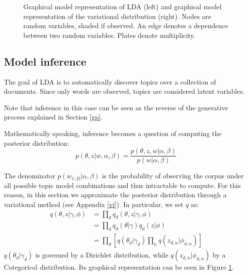 \begin{figure}[h]
    \centering
    \caption{Graphical model representation of LDA (left) and graphical model representation of the variational distribution (right). Nodes are random variables, shaded if observed. An edge denotes a dependence between two random variables. Plates denote multiplicity.}
    \label{fig:lda}
\end{figure}

\subsection{Model inference} \label{modelinference}
The goal of LDA is to automatically discover topics over a collection of documents.
Since only words are observed, topics are considered latent variables.

Note that inference in this case can be seen as the reverse of the generative process explained in Section \ref{gp}.

Mathematically speaking, inference becomes a question of computing the posterior distribution:
\[ p(\theta, z | w, \alpha, \beta) = \frac{p(\theta, z, w | \alpha, \beta)}{p(w| \alpha, \beta)} \]

The denominator $p(w_{1:D} | \alpha, \beta)$ is the probability of observing the corpus under all possible topic model combinations
and thus intractable to compute.
For this reason, in this section we approximate the posterior distribution through a variational method
(see Appendix \ref{vi}).
In particular, we set $q$ as:
\begin{equation*}
    \begin{split}
        q(\theta, z | \gamma, \phi) & = \prod_d q_d(\theta, z | \gamma, \phi) \\
        & = \prod_d q_d(\theta | \gamma) q_d(z | \phi) \\
        & = \prod_d [q(\theta_d | \gamma_d) \prod_n q(z_{d,n} | \phi_{d,n})]
    \end{split}
\end{equation*}
$q(\theta_d | \gamma_d)$ is governed by a Dirichlet distribution, while $q(z_{d,n} | \phi_{d,n})$ by a Categorical distribution.
Its graphical representation can be seen in Figure \ref{fig:lda}.

